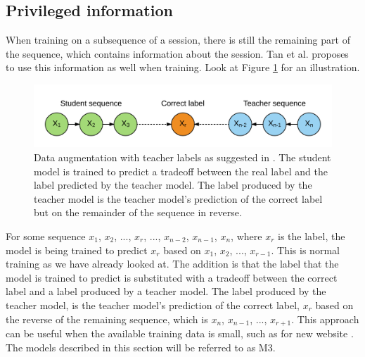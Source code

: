 \subsection{Privileged information}
When training on a subsequence of a session, there is still the remaining part of the sequence, which contains information about the session. Tan et al. proposes to use this information as well when training. Look at Figure \ref{fig:rnn-teacher-student} for an illustration.

\begin{figure}[htp]
	\centering
	\includegraphics[width=1.0\textwidth]{fig/rnn-teacher-student.png}
	\caption{Data augmentation with teacher labels as suggested in \cite{DBLP:journals/corr/TanXL16}. The student model is trained to predict a tradeoff between the real label and the label predicted by the teacher model. The label produced by the teacher model is the teacher model's prediction of the correct label but on the remainder of the sequence in reverse.}
	\label{fig:rnn-teacher-student}
\end{figure}

For some sequence \lbrack $x_1$, $x_2$, ..., $x_r$, ..., $x_{n-2}$, $x_{n-1}$, $x_n$\rbrack, where $x_r$ is the label, the model is being trained to predict $x_r$ based on \lbrack $x_1$, $x_2$, ..., $x_{r-1}$\rbrack. This is normal training as we have already looked at. The addition is that the label that the model is trained to predict is substituted with a tradeoff between the correct label and a label produced by a teacher model. The label produced by the teacher model, is the teacher model's prediction of the correct label, $x_r$ based on the reverse of the remaining sequence, which is \lbrack $x_n$, $x_{n-1}$, ..., $x_{r+1}$\rbrack. This approach can be useful when the available training data is small, such as for new website \cite{DBLP:journals/corr/TanXL16}. The models described in this section will be referred to as M3.

